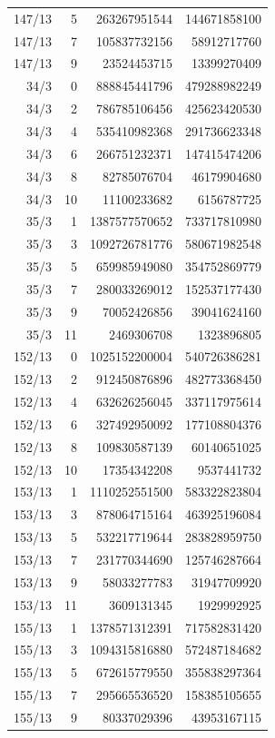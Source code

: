 \begin{longtable}{@{}rrrr@{}}
147/13 & 5 & 263267951544 & 144671858100\\
147/13 & 7 & 105837732156 & 58912717760\\
147/13 & 9 & 23524453715 & 13399270409\\
34/3 & 0 & 888845441796 & 479288982249\\
34/3 & 2 & 786785106456 & 425623420530\\
34/3 & 4 & 535410982368 & 291736623348\\
34/3 & 6 & 266751232371 & 147415474206\\
34/3 & 8 & 82785076704 & 46179904680\\
34/3 & 10 & 11100233682 & 6156787725\\
35/3 & 1 & 1387577570652 & 733717810980\\
35/3 & 3 & 1092726781776 & 580671982548\\
35/3 & 5 & 659985949080 & 354752869779\\
35/3 & 7 & 280033269012 & 152537177430\\
35/3 & 9 & 70052426856 & 39041624160\\
35/3 & 11 & 2469306708 & 1323896805\\
152/13 & 0 & 1025152200004 & 540726386281\\
152/13 & 2 & 912450876896 & 482773368450\\
152/13 & 4 & 632626256045 & 337117975614\\
152/13 & 6 & 327492950092 & 177108804376\\
152/13 & 8 & 109830587139 & 60140651025\\
152/13 & 10 & 17354342208 & 9537441732\\
153/13 & 1 & 1110252551500 & 583322823804\\
153/13 & 3 & 878064715164 & 463925196084\\
153/13 & 5 & 532217719644 & 283828959750\\
153/13 & 7 & 231770344690 & 125746287664\\
153/13 & 9 & 58033277783 & 31947709920\\
153/13 & 11 & 3609131345 & 1929992925\\
155/13 & 1 & 1378571312391 & 717582831420\\
155/13 & 3 & 1094315816880 & 572487184682\\
155/13 & 5 & 672615779550 & 355838297364\\
155/13 & 7 & 295665536520 & 158385105655\\
155/13 & 9 & 80337029396 & 43953167115\\

\end{longtable}
